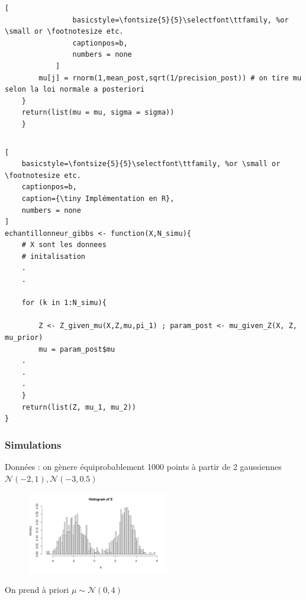 \begin{frame}[fragile]
\begin{columns}
\begin{column}{0.5\textwidth}
\begin{lstlisting}[
                basicstyle=\fontsize{5}{5}\selectfont\ttfamily, %or \small or \footnotesize etc.
                captionpos=b,
                numbers = none
            ]
        mu[j] = rnorm(1,mean_post,sqrt(1/precision_post)) # on tire mu selon la loi normale a posteriori
    }
    return(list(mu = mu, sigma = sigma))
    }
        \end{lstlisting}
    \end{column}
\end{columns}
\vspace{-0.3cm}
\begin{lstlisting}[
    basicstyle=\fontsize{5}{5}\selectfont\ttfamily, %or \small or \footnotesize etc.
    captionpos=b,
    caption={\tiny Implémentation en R},
    numbers = none
]
echantillonneur_gibbs <- function(X,N_simu){
    # X sont les donnees
    # initalisation
    .
    .
    
    for (k in 1:N_simu){ 
        
        Z <- Z_given_mu(X,Z,mu,pi_1) ; param_post <- mu_given_Z(X, Z, mu_prior)
        mu = param_post$mu
    .
    .
    .
    }
    return(list(Z, mu_1, mu_2))
}     
\end{lstlisting}
\end{frame}

\begin{frame}
    \frametitle{Simulations} \hfill \small Données : on gènere équiprobablement 1000 points à partir de 2 gaussiennes $\mathcal{N}\left(-2, 1\right), \mathcal{N}\left(-3, 0.5\right)$
    
    \centering
   
            
            \begin{figure}
                \includegraphics[width=0.55\textwidth]{../MCMC_numeric/simu_gaussian/data.png} 
            \end{figure}
   
    \vspace{-0.2cm}
    
    On prend à priori $\mu \sim \mathcal{N}\left(0, 4\right)$
\end{frame}


